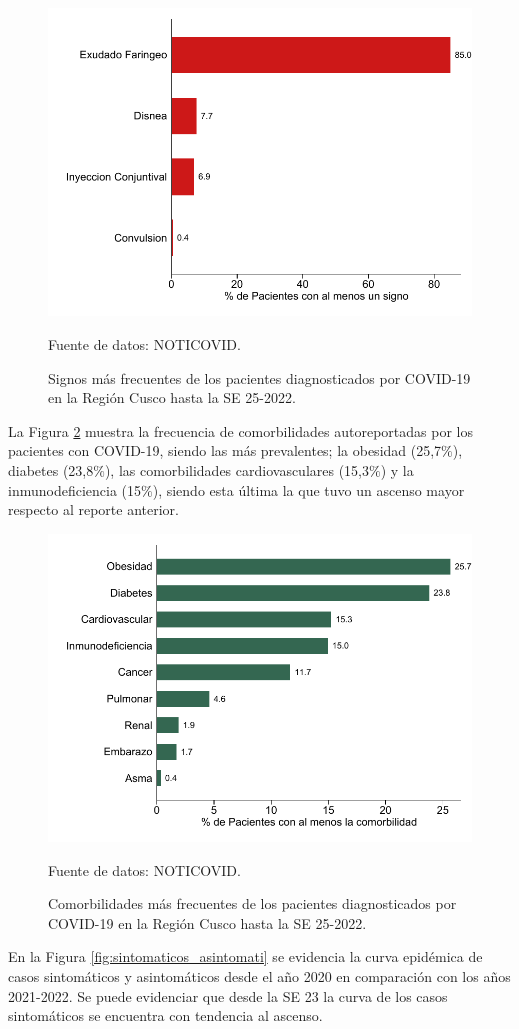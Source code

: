 \documentclass[12pt,a4paper,openany]{book}
\begin{document}
	\begin{figure}[h]
		\caption{Signos más frecuentes de los pacientes diagnosticados por COVID-19 en la Región Cusco hasta la SE 25-2022.}\label{fig:signos}
		\begin{center}
			\includegraphics[width=0.65\linewidth]{../figuras/figura_signo.pdf}
		\end{center}
		{\footnotesize {Fuente de datos: NOTICOVID.}}
	\end{figure}
	
	\noindent La Figura \ref{fig:comorbilidades} muestra la frecuencia de comorbilidades autoreportadas por los pacientes con COVID-19, siendo las más prevalentes; la obesidad (25,7$\%$), diabetes (23,8$\%$), las comorbilidades cardiovasculares (15,3$\%$) y la inmunodeficiencia (15$\%$), siendo esta última la que tuvo un ascenso mayor respecto al reporte anterior.
	
	  
	\begin{figure}[h]
				\caption{Comorbilidades más frecuentes de los pacientes diagnosticados por COVID-19 en la Región Cusco hasta la SE 25-2022. }\label{fig:comorbilidades}
		\begin{center}
			\includegraphics[width=0.65\linewidth]{../figuras/figura_comorbilidad.pdf}
		\end{center}
		{\footnotesize {Fuente de datos: NOTICOVID.}}
	\end{figure}
	\clearpage
	En la Figura \ref{fig:sintomaticos_asintomati} se evidencia la curva epidémica de casos sintomáticos y asintomáticos desde el año 2020 en comparación con los años 2021-2022. Se puede evidenciar que desde la SE 23 la curva de los casos sintomáticos se encuentra con tendencia al ascenso.
	
\end{document}
